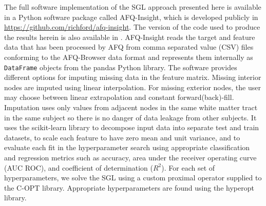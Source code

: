 The full software implementation of the SGL approach presented here is available
in a Python software package called AFQ-Insight, which is developed publicly in
\url{https://github.com/richford/afq-insight}. The version of the code used to
produce the results herein is also available in .
AFQ-Insight reads the target and feature data that has been processed by AFQ
from comma separated value (CSV) files conforming to the AFQ-Browser data
format\cite{yeatman2018browser} and represents them internally as
\lstinline{DataFrame} objects from the pandas Python
library\cite{mckinney2010data}. The software provides different options for
imputing missing data in the feature matrix. Missing interior nodes are imputed
using linear interpolation. For missing exterior nodes, the user may choose
between linear extrapolation and constant forward(back)-fill. Imputation uses
only values from adjacent nodes in the same white matter tract in the same
subject so there is no danger of data leakage from other subjects. It uses the
scikit-learn\cite{scikit-learn} library to decompose input data into separate
test and train datasets, to scale each feature to have zero mean and
unit variance, and to evaluate each fit in the hyperparameter search using
appropriate classification and regression metrics such as accuracy, area
under the receiver operating curve (AUC ROC), and coefficient of determination
($R^2$). For each set of hyperparameters, we solve the SGL using a custom
proximal operator supplied to the C-OPT library\cite{copt}. Appropriate
hyperparameters are found using the hyperopt library\cite{Bergstra_2015}.
